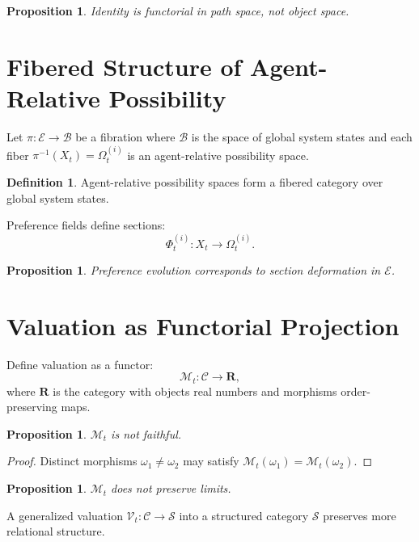 \documentclass[11pt,a4paper]{article}
\newtheorem{proposition}[theorem]{Proposition}
\theoremstyle{definition}
\newtheorem{definition}[theorem]{Definition}
\theoremstyle{remark}
\begin{document}
\begin{proposition}
Identity is functorial in path space, not object space.
\end{proposition}

\section{Fibered Structure of Agent-Relative Possibility}

Let $\pi : \mathcal{E} \to \mathcal{B}$ be a fibration where $\mathcal{B}$ is the space of global system states and each fiber $\pi^{-1}(X_t) = \Omega_t^{(i)}$ is an agent-relative possibility space.

\begin{definition}
Agent-relative possibility spaces form a fibered category over global system states.
\end{definition}

Preference fields define sections:
\[
\Phi_t^{(i)} : X_t \to \Omega_t^{(i)}.
\]

\begin{proposition}
Preference evolution corresponds to section deformation in $\mathcal{E}$.
\end{proposition}

\section{Valuation as Functorial Projection}

Define valuation as a functor:
\[
\mathcal{M}_t : \mathcal{C} \to \mathbf{R},
\]
where $\mathbf{R}$ is the category with objects real numbers and morphisms order-preserving maps.

\begin{proposition}
$\mathcal{M}_t$ is not faithful.
\end{proposition}

\begin{proof}
Distinct morphisms $\omega_1 \neq \omega_2$ may satisfy $\mathcal{M}_t(\omega_1) = \mathcal{M}_t(\omega_2)$.
\end{proof}

\begin{proposition}
$\mathcal{M}_t$ does not preserve limits.
\end{proposition}

A generalized valuation $\mathcal{V}_t : \mathcal{C} \to \mathcal{S}$ into a structured category $\mathcal{S}$ preserves more relational structure.
\end{document}

